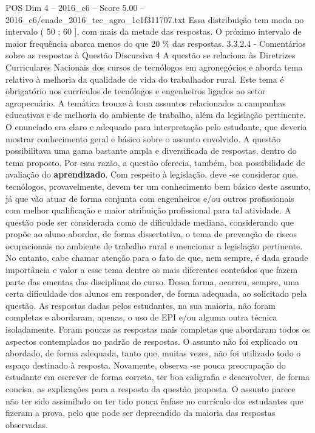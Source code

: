 \begin{textsample}{POS Dim 4 – 2016\_c6 – Score 5.00 – 2016\_c6/enade\_2016\_tec\_agro\_1c1f311707.txt}
Essa distribuição tem moda no intervalo ( 50 ; 60 ], com mais da metade das respostas.
O próximo intervalo de maior frequência abarca menos do que 20 \% das respostas. 3.3.2.4 - Comentários sobre as respostas à Questão Discursiva 4 A questão se relaciona às Diretrizes Curriculares Nacionais dos cursos de tecnólogos em agronegócios e aborda tema relativo à melhoria da qualidade de vida do trabalhador rural.
Este tema é obrigatório nos currículos de tecnólogos e engenheiros ligados ao setor agropecuário.
A temática trouxe à tona assuntos relacionados a campanhas educativas e de melhoria do ambiente de trabalho, além da legislação pertinente.
O enunciado era claro e adequado para interpretação pelo estudante, que deveria mostrar conhecimento geral e básico sobre o assunto envolvido.
A questão possibilitava uma gama bastante ampla e diversificada de respostas, dentro do tema proposto.
Por essa razão, a questão oferecia, também, boa possibilidade de avaliação do \textbf{aprendizado}.
Com respeito à legislação, deve -se considerar que, tecnólogos, provavelmente, devem ter um conhecimento bem básico deste assunto, já que vão atuar de forma conjunta com engenheiros e/ou outros profissionais com melhor qualificação e maior atribuição profissional para tal atividade.
A questão pode ser considerada como de dificuldade mediana, considerando que propõe ao aluno abordar, de forma dissertativa, o tema de prevenção de riscos ocupacionais no ambiente de trabalho rural e mencionar a legislação pertinente.
No entanto, cabe chamar atenção para o fato de que, nem sempre, é dada grande importância e valor a esse tema dentre os mais diferentes conteúdos que fazem parte das ementas das disciplinas do curso.
Dessa forma, ocorreu, sempre, uma certa dificuldade dos alunos em responder, de forma adequada, ao solicitado pela questão.
As respostas dadas pelos estudantes, na sua maioria, não foram completas e abordaram, apenas, o uso de EPI e/ou alguma outra técnica isoladamente.
Foram poucas as respostas mais completas que abordaram todos os aspectos contemplados no padrão de respostas.
O assunto não foi explicado ou abordado, de forma adequada, tanto que, muitas vezes, não foi utilizado todo o espaço destinado à resposta.
Novamente, observa -se pouca preocupação do estudante em escrever de forma correta, ter boa caligrafia e desenvolver, de forma concisa, as explicações para a resposta da questão proposta.
O assunto parece não ter sido assimilado ou ter tido pouca ênfase no currículo dos estudantes que fizeram a prova, pelo que pode ser depreendido da maioria das respostas observadas.

\end{textsample}

